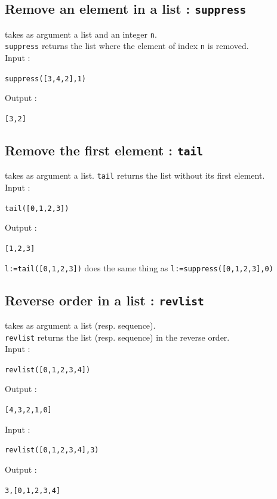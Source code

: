 \documentclass[a4paper,11pt]{book}
\begin{document}
\subsection{Remove an element in a list : {\tt suppress}}
 takes as argument a list and an integer {\tt n}.\\
{\tt suppress} returns the list where the element of index {\tt n} is 
removed.\\
Input :
\begin{center}{\tt suppress([3,4,2],1)}\end{center}
Output :
\begin{center}{\tt  [3,2]}\end{center}

\subsection{Remove the first  element : {\tt tail}}
 takes as argument a list.
{\tt tail} returns the list without its first element.\\
Input :
\begin{center}{\tt tail([0,1,2,3])}\end{center}
Output :
\begin{center}{\tt  [1,2,3]}\end{center}
{\tt l:=tail([0,1,2,3])} does the same thing as
{\tt l:=suppress([0,1,2,3],0)}\\

\subsection{Reverse order in a list : {\tt revlist}}
 takes as argument a list (resp. sequence).\\
{\tt revlist} returns the list (resp. sequence) in the reverse order.\\
Input :
\begin{center}{\tt revlist([0,1,2,3,4])}\end{center}
Output :
\begin{center}{\tt  [4,3,2,1,0]}\end{center}
Input :
\begin{center}{\tt revlist([0,1,2,3,4],3)}\end{center}
Output :
\begin{center}{\tt 3,[0,1,2,3,4]}\end{center}
\end{document}
